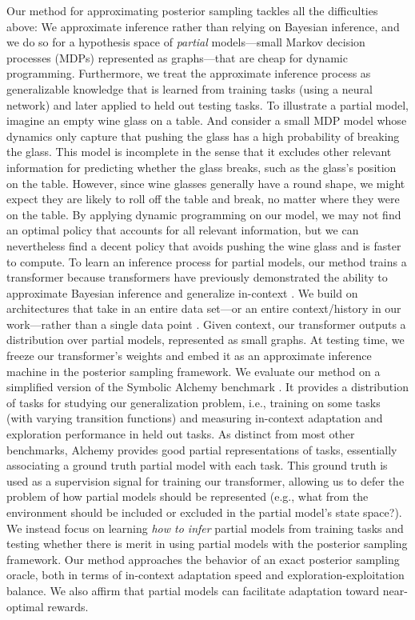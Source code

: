\documentclass[sigconf]{aamas}
\begin{document}
Our method for approximating posterior sampling tackles all the difficulties above: We approximate inference rather than relying on Bayesian inference, and we do so for a hypothesis space of \textit{partial} models---small Markov decision processes (MDPs) represented as graphs---that are cheap for dynamic programming. Furthermore, we treat the approximate inference process as generalizable knowledge that is learned from training tasks (using a neural network) and later applied to held out testing tasks.
To illustrate a partial model, imagine an empty wine glass on a table. And consider a small MDP model whose dynamics only capture that pushing the glass has a high probability of breaking the glass. This model is incomplete in the sense that it excludes other relevant information for predicting whether the glass breaks, such as the glass's position on the table. However, since wine glasses generally have a round shape, we might expect they are likely to roll off the table and break, no matter where they were on the table. By applying dynamic programming on our model, we may not find an optimal policy that accounts for all relevant information, but we can nevertheless find a decent policy that avoids pushing the wine glass and is faster to compute.
To learn an inference process for partial models, our method trains a transformer \cite{vaswaniAttentionAllYou2017} because transformers have previously demonstrated the ability to approximate Bayesian inference \cite{mullerTransformersCanBayesian2022,xieExplanationIncontextLearning2022} and generalize in-context \cite{brownLanguageModelsAre2020,gargWhatCanTransformers2022}. We build on architectures that take in an entire data set---or an entire context/history in our work---rather than a single data point \cite{kossenSelfAttentionDatapointsGoing2021,goyalRetrievalAugmentedReinforcementLearning2022,keLearningInduceCausal2022,mullerTransformersCanBayesian2022}. Given context, our transformer outputs a distribution over partial models, represented as small graphs.
At testing time, we freeze our transformer's weights and embed it as an approximate inference machine in the posterior sampling framework.
We evaluate our method on a simplified version of the Symbolic Alchemy benchmark \cite{wangAlchemyBenchmarkAnalysis2021}. It provides a distribution of tasks for studying our generalization problem, i.e., training on some tasks (with varying transition functions) and measuring in-context adaptation and exploration performance in held out tasks. As distinct from most other benchmarks, Alchemy provides good partial representations of tasks, essentially associating a ground truth partial model with each task. This ground truth is used as a supervision signal for training our transformer, allowing us to defer the problem of how partial models should be represented (e.g., what from the environment should be included or excluded in the partial model's state space?). We instead focus on learning \textit{how to infer} partial models from training tasks and testing whether there is merit in using partial models with the posterior sampling framework. Our method approaches the behavior of an exact posterior sampling oracle, both in terms of in-context adaptation speed and exploration-exploitation balance. We also affirm that partial models can facilitate adaptation toward near-optimal rewards.
\end{document}
